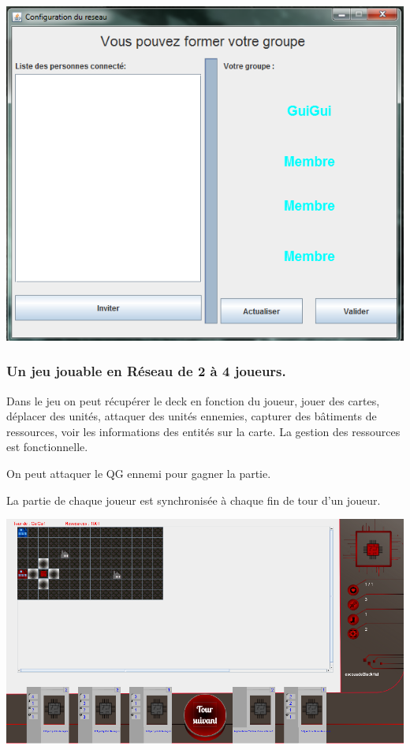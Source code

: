 \documentclass[a4paper,11pt]{report}
\begin{document}
	
	\begin{center}
	\includegraphics[scale=0.5]{Assets/connection3.png} 
	\end{center}
	
	\subsubsection{Un jeu jouable en Réseau de 2 à 4 joueurs.}
	
	Dans le jeu on peut récupérer le deck en fonction du joueur, jouer des cartes, déplacer des unités, attaquer des unités ennemies, capturer des bâtiments de ressources, voir les informations des entités sur la carte. La gestion des ressources est fonctionnelle.
	
	 On peut attaquer le QG ennemi pour gagner la partie.
	
 La partie de chaque joueur est synchronisée à chaque fin de tour d'un joueur.
	\begin{center}
	\includegraphics[scale=0.3]{Assets/UniteeSelectMove.png} 
	\end{center}
	


	
\end{document}
